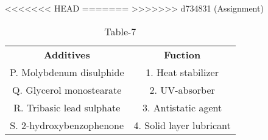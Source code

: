 \begin{table}[htbp]
  \centering
  \caption{Table-7}
<<<<<<< HEAD
  \label{tab:tables/table7.tex}
=======
  \label{table7}
>>>>>>> d734831 (Assignment)
  \begin{tabular}{cc}
\textbf{Additives} & \textbf{Fuction}\\

P. Molybdenum disulphide & 1. Heat stabilizer \\
Q. Glycerol monostearate & 2. UV-absorber \\
R. Tribasic lead sulphate & 3. Antistatic agent \\
S. 2-hydroxybenzophenone & 4. Solid layer lubricant \\
  
  
  
  \end{tabular}
\end{table}